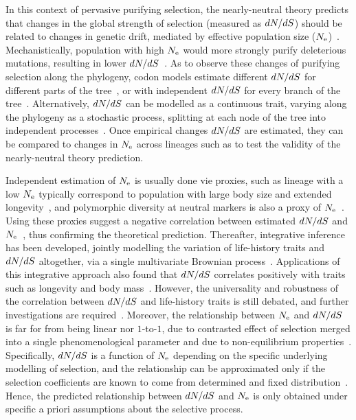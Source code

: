 In this context of pervasive purifying selection, the nearly-neutral theory predicts that changes in the global strength of selection (measured as $dN/dS$) should be related to changes in genetic drift, mediated by effective population size ($N_{\mathrm{e}}$)~\citep{Ohta1992}.
Mechanistically, population with high $N_{\mathrm{e}}$ would more strongly purify deleterious mutations, resulting in lower $dN/dS$~\citep{Kimura1979, Welch2008}.
As to observe these changes of purifying selection along the phylogeny, codon models estimate different $dN/dS$ for different parts of the tree~\citep{Dutheil2012}, or with independent $dN/dS$ for every branch of the tree~\citep{Popadin2007}.
Alternatively, $dN/dS$ can be modelled as a continuous trait, varying along the phylogeny as a stochastic process, splitting at each node of the tree into independent processes~\citep{Seo2004,Lartillot2011}.
Once empirical changes $dN/dS$ are estimated, they can be compared to changes in $N_{\mathrm{e}}$ across lineages such as to test the validity of the nearly-neutral theory prediction.

Independent estimation of $N_{\mathrm{e}}$ is usually done vie proxies, such as lineage with a low $N_{\mathrm{e}}$ typically correspond to population with large body size and extended longevity~\citep{Romiguier2014}, and polymorphic diversity at neutral markers is also a proxy of $N_{\mathrm{e}}$~\citep{Galtier2016}.
Using these proxies suggest a negative correlation between estimated $dN/dS$ and $N_{\mathrm{e}}$~\citep{Popadin2007, Lanfear2010, Romiguier2014}, thus confirming the theoretical prediction.
Thereafter, integrative inference has been developed, jointly modelling the variation of life-history traits and $dN/dS$ altogether, via a single multivariate Brownian process~\citep{Lartillot2011}.
Applications of this integrative approach also found that $dN/dS$ correlates positively with traits such as longevity and body mass~\citep{Lartillot2011, Figuet2017}.
However, the universality and robustness of the correlation between $dN/dS$ and life-history traits is still debated, and further investigations are required~\citep{Nabholz2013,Lanfear2014,Figuet2016, Bolivar2019}.
Moreover, the relationship between $N_{\mathrm{e}}$ and $dN/dS$ is far for from being linear nor $1$-to-$1$, due to contrasted effect of selection merged into a single phenomenological parameter and due to non-equilibrium properties~\citep{Jones2016}.
Specifically, $dN/dS$ is a function of $N_{\mathrm{e}}$ depending on the specific underlying modelling of selection, and the relationship can be approximated only if the selection coefficients are known to come from determined and fixed distribution~\citep{Nielsen2003, Welch2008}.
Hence, the predicted relationship between $dN/dS$ and $N_{\mathrm{e}}$ is only obtained under specific a priori assumptions about the selective process.


